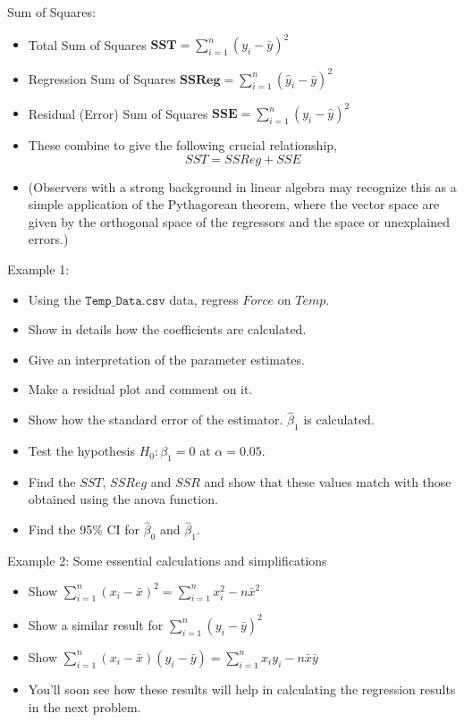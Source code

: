 \documentclass{beamer}
\begin{document}
	
	\begin{frame}{Sum of Squares:}
		\begin{itemize}
			\item Total Sum of Squares $\bm{SST}=\sum_{i=1}^n(y_i-\bar{y})^2$
			\item Regression Sum of Squares $\bm{SSReg}=\sum_{i=1}^n(\hat{y}_i-\bar{y})^2$
			\item Residual (Error) Sum of Squares $\bm{SSE}=\sum_{i=1}^n(y_i-\hat{y})^2$
			\item These combine to give the following crucial relationship,$$SST = SSReg+SSE$$
			\item (Observers with a strong background in linear algebra may recognize this as a simple application of the Pythagorean theorem, where the vector space are given by the orthogonal space of the regressors and the space or unexplained errors.)
		\end{itemize}
	\end{frame}
	
	\begin{frame}{Example 1: }
		\begin{itemize}
			\item Using the $\mathtt{Temp\_Data.csv}$ data, regress $Force$ on $Temp$.
			\item Show in details how the coefficients are calculated.
			\item Give an interpretation of the parameter estimates.
			\item Make a residual plot and comment on it.
			\item Show how the standard error of the estimator. $\hat{\beta}_1$ is calculated.
			\item Test the hypothesis $H_0:\beta_1=0$ at $\alpha=0.05$.
			\item Find the $SST$, $SSReg$ and $SSR$ and show that these values match with those obtained using the anova function.
			\item Find the 95\% CI for $\hat{\beta}_0$ and $\hat{\beta}_1$.
		\end{itemize}
	\end{frame}
	
	
	
	
	
	\begin{frame}{Example 2: Some essential calculations and simplifications}
		\begin{itemize}
			\item Show $\sum_{i=1}^n (x_i-\bar{x})^2 = \sum_{i=1}^n x_i^2- n\bar{x}^2$
			\item Show a similar result for $\sum_{i=1}^n (y_i-\bar{y})^2$
			\item Show $\sum_{i=1}^n (x_i-\bar{x})(y_i-\bar{y}) = \sum_{i=1}^n x_iy_i- n\bar{x}\bar{y}$
			\item You'll soon see how these results will help in calculating the regression results in the next problem.
		\end{itemize}
	\end{frame}
	
\end{document}
